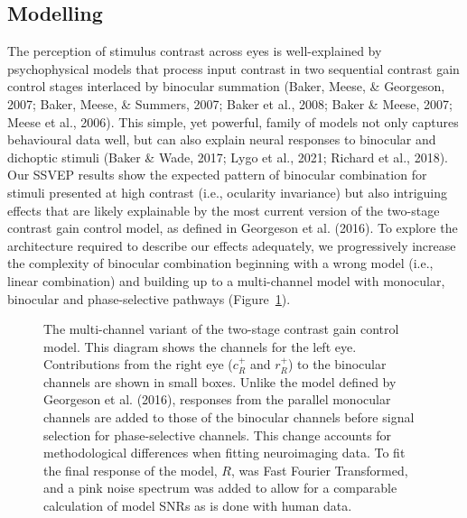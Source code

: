 \documentclass[
  12pt,
]{article}
\begin{document}
\subsection{Modelling}\label{modelling}

The perception of stimulus contrast across eyes is well-explained by
psychophysical models that process input contrast in two sequential
contrast gain control stages interlaced by binocular summation (Baker,
Meese, \& Georgeson, 2007; Baker, Meese, \& Summers, 2007; Baker et al.,
2008; Baker \& Meese, 2007; Meese et al., 2006). This simple, yet
powerful, family of models not only captures behavioural data well, but
can also explain neural responses to binocular and dichoptic stimuli
(Baker \& Wade, 2017; Lygo et al., 2021; Richard et al., 2018). Our
SSVEP results show the expected pattern of binocular combination for
stimuli presented at high contrast (i.e., ocularity invariance) but also
intriguing effects that are likely explainable by the most current
version of the two-stage contrast gain control model, as defined in
Georgeson et al. (2016). To explore the architecture required to
describe our effects adequately, we progressively increase the
complexity of binocular combination beginning with a wrong model (i.e.,
linear combination) and building up to a multi-channel model with
monocular, binocular and phase-selective pathways
(Figure~\ref{fig-modelDiagram}).

\begin{figure}


\caption{\label{fig-modelDiagram}The multi-channel variant of the
two-stage contrast gain control model. This diagram shows the channels
for the left eye. Contributions from the right eye (\(c^+_R\) and
\(r^+_R\)) to the binocular channels are shown in small boxes. Unlike
the model defined by Georgeson et al. (2016), responses from the
parallel monocular channels are added to those of the binocular channels
before signal selection for phase-selective channels. This change
accounts for methodological differences when fitting neuroimaging data.
To fit the final response of the model, \(R\), was Fast Fourier
Transformed, and a pink noise spectrum was added to allow for a
comparable calculation of model SNRs as is done with human data.}

\end{figure}%
\end{document}

